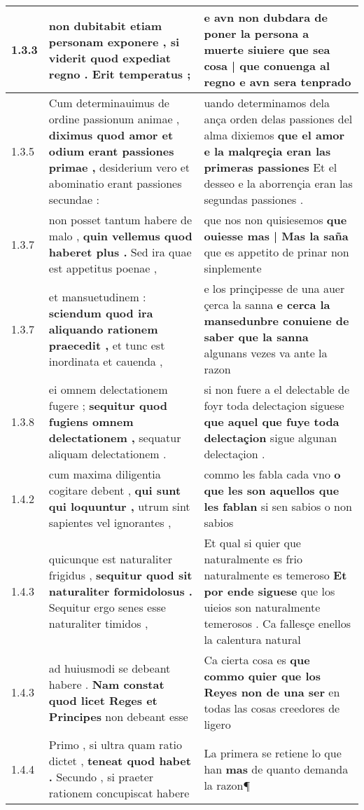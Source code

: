 \begin{tabular}{|p{1cm}|p{6.5cm}|p{6.5cm}|}
1.3.3 & non dubitabit etiam personam exponere , \textbf{ si viderit quod expediat regno . } Erit temperatus ; & e avn non dubdara de poner la persona a muerte siuiere \textbf{ que sea cosa | que conuenga al regno } e avn sera tenprado \\\hline
1.3.5 & Cum determinauimus de ordine passionum animae , \textbf{ diximus quod amor et odium erant passiones primae , } desiderium vero et abominatio erant passiones secundae : & uando determinamos dela ança orden delas passiones del alma dixiemos \textbf{ que el amor e la malqreçia eran las primeras passiones } Et el desseo e la aborrençia eran las segundas passiones . \\\hline
1.3.7 & non posset tantum habere de malo , \textbf{ quin vellemus quod haberet plus . } Sed ira quae est appetitus poenae , & que nos non quisiesemos \textbf{ que ouiesse mas | Mas la saña } que es appetito de prinar non sinplemente \\\hline
1.3.7 & et mansuetudinem : \textbf{ sciendum quod ira aliquando rationem praecedit , } et tunc est inordinata et cauenda , & e los prinçipesse de una auer çerca la sanna \textbf{ e cerca la mansedunbre conuiene de saber que la sanna } algunans vezes va ante la razon \\\hline
1.3.8 & ei omnem delectationem fugere ; \textbf{ sequitur quod fugiens omnem delectationem , } sequatur aliquam delectationem . & si non fuere a el delectable de foyr toda delectaçion siguese \textbf{ que aquel que fuye toda delectaçion } sigue algunan delectaçion . \\\hline
1.4.2 & cum maxima diligentia cogitare debent , \textbf{ qui sunt qui loquuntur , } utrum sint sapientes vel ignorantes , & commo les fabla cada vno \textbf{ o que les son aquellos que les fablan } si sen sabios o non sabios \\\hline
1.4.3 & quicunque est naturaliter frigidus , \textbf{ sequitur quod sit naturaliter formidolosus . } Sequitur ergo senes esse naturaliter timidos , & Et qual si quier que naturalmente es frio naturalmente es temeroso \textbf{ Et por ende siguese } que los uieios son naturalmente temerosos . Ca fallesçe enellos la calentura natural \\\hline
1.4.3 & ad huiusmodi se debeant habere . \textbf{ Nam constat quod licet Reges et Principes } non debeant esse & Ca cierta cosa es \textbf{ que commo quier que los Reyes non de una ser } en todas las cosas creedores de ligero \\\hline
1.4.4 & Primo , si ultra quam ratio dictet , \textbf{ teneat quod habet . } Secundo , si praeter rationem concupiscat habere & La primera se retiene lo que han \textbf{ mas } de quanto demanda la razon¶ \\\hline

\end{tabular}
